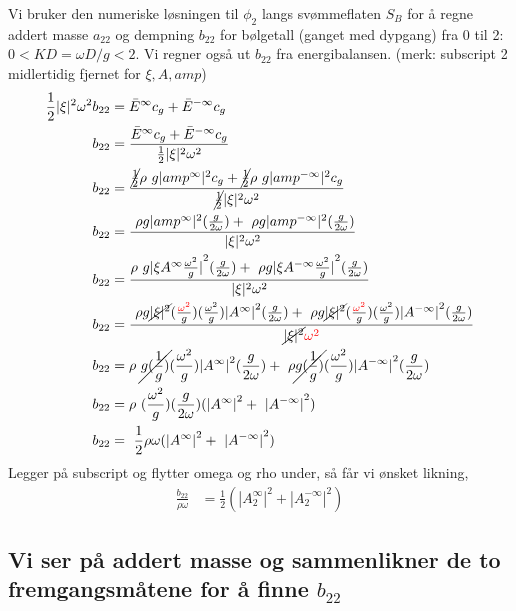 Vi bruker den numeriske løsningen til $\phi_2$ langs svømmeflaten $S_B$ for å regne addert masse $a_{22}$ og dempning $b_{22}$ for bølgetall (ganget med dypgang) fra 0 til 2: $0 < KD = \omega D / g < 2$. Vi regner også ut $b_{22}$ fra energibalansen. %
(merk: subscript 2 midlertidig fjernet for $\xi, A, amp$)
\begin{align}
	\frac{1}{2} |\xi|^2 \omega^2 b_{22} &=  {\bar{E}^{\infty} c_g + \bar{E}^{-\infty} c_g }\\
	b_{22} &=  \frac{\bar{E}^{\infty} c_g + \bar{E}^{-\infty} c_g }{\frac{1}{2} |\xi|^2 \omega^2}\\
	b_{22} &=  \frac{\cancel{\frac{1}{2}}\rho g |amp^{\infty}|^2  c_g + \cancel{\frac{1}{2}}\rho g |amp^{-\infty}|^2 c_g }{\cancel{\frac{1}{2}} |\xi|^2 \omega^2}\\
	b_{22} &=  \frac{ \rho g |amp^{\infty}|^2  (\frac{g}{2\omega}) +  \rho g |amp^{-\infty}|^2 (\frac{g}{2\omega}) }{ |\xi|^2 \omega^2}\\
	b_{22} &=  \frac{\rho g {|\xi A^{\infty} \frac{\omega^2}{g}|}^2  (\frac{g}{2\omega}) +  \rho g {|\xi A^{-\infty} \frac{\omega^2}{g}|}^2  (\frac{g}{2\omega}) }{ |\xi|^2 \omega^2}\\
	b_{22} &=  \frac{  \rho g \cancel{|\xi|^2} (\frac{\color{red}{\omega^2}}{g})(\frac{\omega^2}{g}) {| A^{\infty} |}^2  (\frac{g}{2\omega}) + \rho g \cancel{|\xi|^2}  (\frac{\color{red}{\omega^2}}{g})(\frac{\omega^2}{g}) {| A^{-\infty}|}^2  (\frac{g}{2\omega}) }{ \cancel{|\xi|^2} \color{red}{\omega^2}}\\
	b_{22} &=   \rho  \cancel{g  (\frac{1}{g})}(\frac{\omega^2}{g}) {| A^{\infty} |}^2  (\frac{g}{2\omega}) +  \rho \cancel{g   (\frac{1}{g})}(\frac{\omega^2}{g}) {| A^{-\infty}|}^2  (\frac{g}{2\omega}) \\
	b_{22} &=  \rho  (\frac{\omega^2}{g})   (\frac{g}{2\omega}) ({| A^{\infty} |}^2 +  {| A^{-\infty}|}^2)\\
	b_{22} &=    \frac{1}{2} \rho \omega ({| A^{\infty} |}^2 +  {| A^{-\infty}|}^2)
\end{align}
Legger på subscript og flytter omega og rho under, så får vi ønsket likning, 
\begin{align}
	\frac{b_{22}}{\rho \omega} &=    \frac{1}{2}  ({| A_2^{\infty} |}^2 +  {| A_2^{-\infty}|}^2)
\end{align}

\subsection{Vi ser på addert masse og sammenlikner de to fremgangsmåtene for å finne $b_{22}$}

